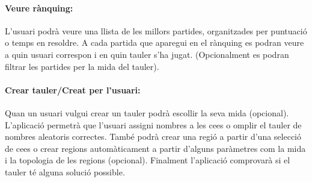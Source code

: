 \documentclass[a4paper,12pt]{article}
\begin{document}
\paragraph{Veure rànquing:} 
L'usuari podrà veure una llista de les millors partides, organitzades per puntuació o temps en resoldre. A cada partida que aparegui en el rànquing es podran veure a quin usuari correspon i en quin tauler s'ha jugat. (Opcionalment es podran filtrar les partides per la mida del tauler).

\paragraph{Crear tauler/Creat per l'usuari:}
Quan un usuari vulgui crear un tauler  podrà escollir la seva mida (opcional). L'aplicació permetrà que l'usuari assigni nombres a les ce\lgem es o omplir el tauler de nombres aleatoris correctes. També podrà crear una regió a partir d'una selecció de ce\lgem es o crear regions automàticament a partir d'alguns paràmetres com la mida i la topologia de les regions (opcional). Finalment l'aplicació comprovarà si el tauler té alguna solució possible.
\end{document}
